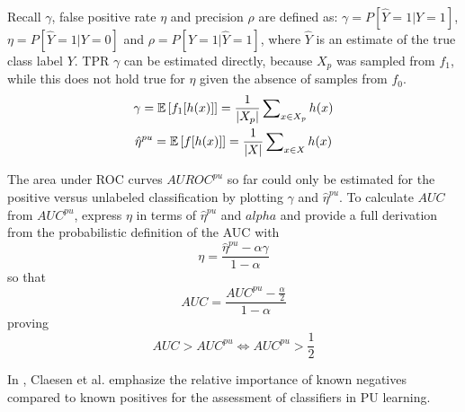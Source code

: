 Recall \(\gamma\), false positive rate \(\eta\) and precision \(\rho\) are defined as: \(\gamma = P[\hat{Y} = 1| Y = 1]\), \(\eta = P[\hat{Y} = 1| Y = 0]\) and \(\rho = P[Y = 1| \hat{Y} = 1]\), where \(\hat{Y}\) is an estimate of the true class label \(Y\). TPR \(\gamma\) can be estimated directly, because \(X_p\) was sampled from \(f_1\), while this does not hold true for \(\eta\) given the absence of samples from \(f_0\). 
\begin{gather*}
\gamma = {\mathbb E}\left[ f_1[h(x)] \right] = \frac{1}{|X_p|} \sum\nolimits_{x \in X_p} h(x) \\
\hat{\eta}^{pu} = {\mathbb E}\left[ f[h(x)] \right] = \frac{1}{|X|} \sum\nolimits_{x \in X} h(x)
\end{gather*}

The area under ROC curves \(AUROC^{pu}\) so far could only be estimated for the positive versus unlabeled classification by plotting \(\gamma\) and \(\hat{\eta}^{pu}\). To calculate \(AUC\) from \(AUC^{pu}\), \cite{jain} express \(\eta\) in terms of \(\hat{\eta}^{pu}\) and \(alpha\) and provide a full derivation from the probabilistic definition of the AUC with
\[\eta = \frac{\hat{\eta}^{pu} - \alpha \gamma}{1 - \alpha}\] so that
\[AUC = \frac{AUC^{pu} - \frac{\alpha}{2}}{1 - \alpha}\] proving
\[AUC > AUC^{pu} \iff AUC^{pu} > \frac{1}{2}\]

In \cite{claesen2}, Claesen et al. emphasize the relative importance of known negatives compared to known positives for the assessment of classifiers in PU learning.



